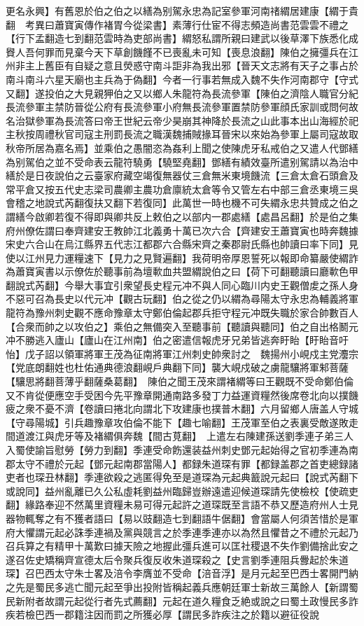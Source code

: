 更名永興】有舊恩於伯之伯之以繕為别駕永忠為記室參軍河南禇緭居建康【緭于貴翻　考異曰蕭寶寅傳作褚胃今從梁書】素薄行仕宦不得志頻造尚書范雲雲不禮之【行下孟翻造七到翻范雲時為吏部尚書】緭怒私謂所親曰建武以後草澤下族悉化成䝿人吾何罪而見棄今天下草創饑饉不已喪亂未可知【喪息浪翻】陳伯之擁彊兵在江州非主上舊臣有自疑之意且熒惑守南斗詎非為我出邪【晉天文志將有天子之事占於南斗南斗六星天廟也主兵為于偽翻】今者一行事若無成入魏不失作河南郡守【守式又翻】遂投伯之大見親狎伯之又以鄉人朱龍符為長流參軍【陳伯之濟陰人職官分紀長流參軍主禁防晉從公府有長流參軍小府無長流參軍置禁防參軍顔氏家訓或問何故名治獄參軍為長流答曰帝王世紀云帝少昊崩其神降於長流之山此事本出山海經於祀主秋按周禮秋官司寇主刑罰長流之職漢魏捕賊掾耳晉宋以來始為參軍上屬司寇故取秋帝所居為嘉名焉】並乘伯之愚闇恣為姦利上聞之使陳虎牙私戒伯之又遣人代鄧繕為别駕伯之並不受命表云龍符驍勇【驍堅堯翻】鄧繕有績效臺所遣别駕請以為治中繕於是日夜說伯之云臺家府藏空竭復無器仗三倉無米東境饑流【三倉太倉石頭倉及常平倉又按五代史志梁司農卿主農功倉廪統太倉等令又管左右中部三倉丞東境三吳會稽之地說式芮翻復扶又翻下若復同】此萬世一時也機不可失緭永忠共贊成之伯之謂繕今啟卿若復不得即與卿共反上敕伯之以部内一郡處繕【處昌呂翻】於是伯之集府州僚佐謂曰奉齊建安王教帥江北義勇十萬已次六合【齊建安王蕭寶寅也時奔魏據宋史六合山在烏江縣界五代志江都郡六合縣宋齊之秦郡尉氏縣也帥讀曰率下同】見使以江州見力運糧速下【見力之見賢遍翻】我荷明帝厚恩誓死以報即命纂嚴使緭詐為蕭寶寅書以示僚佐於聽事前為壇㰱血共盟緭說伯之曰【荷下可翻聽讀曰廳㰱色甲翻說式芮翻】今舉大事宜引衆望長史程元冲不與人同心臨川内史王觀僧䖍之孫人身不惡可召為長史以代元冲【觀古玩翻】伯之從之仍以緭為尋陽太守永忠為輔義將軍龍符為豫州刺史觀不應命豫章太守鄭伯倫起郡兵拒守程元冲既失職於家合帥數百人【合衆而帥之以攻伯之】乘伯之無備突入至聽事前【聽讀與聽同】伯之自出格鬭元冲不勝逃入廬山【廬山在江州南】伯之密遣信報虎牙兄弟皆逃奔盱眙【盱眙音吁怡】戊子詔以領軍將軍王茂為征南將軍江州刺史帥衆討之　魏揚州小峴戍主党灋宗【党底朗翻姓也杜佑通典德浪翻峴戶典翻下同】襲大峴戍破之虜龍驤將軍邾菩薩【驤思將翻菩薄乎翻薩桑葛翻】　陳伯之聞王茂來謂褚緭等曰王觀既不受命鄭伯倫又不肯從便應空手受困今先平豫章開通南路多發丁力益運資糧然後席卷北向以撲饑疲之衆不憂不濟【卷讀曰捲北向謂北下攻建康也撲普木翻】六月留鄉人唐盖人守城【守尋陽城】引兵趣豫章攻伯倫不能下【趣七喻翻】王茂軍至伯之表裏受敵遂敗走間道渡江與虎牙等及褚緭俱奔魏【間古莧翻】　上遣左右陳建孫送劉季連子弟三人入蜀使諭旨慰勞【勞力到翻】季連受命飭還装益州刺史鄧元起始得之官初季連為南郡太守不禮於元起【鄧元起南郡當陽人】都録朱道琛有罪【都録盖郡之首吏總録諸吏者也琛丑林翻】季連欲殺之逃匿得免至是道琛為元起典籖說元起曰【說式芮翻下或說同】益州亂離已久公私虛耗劉益州臨歸豈辦遠遣迎候道琛請先使檢校【使疏吏翻】緣路奉迎不然萬里資糧未易可得元起許之道琛既至言語不恭又歷造府州人士見器物輒奪之有不獲者語曰【易以豉翻造七到翻語牛倨翻】會當屬人何須苦惜於是軍府大懼謂元起必誅季連禍及黨與競言之於季連季連亦以為然且懼昔之不禮於元起乃召兵算之有精甲十萬歎曰據天險之地握此彊兵進可以匡社稷退不失作劉備捨此安之遂召佐史矯稱齊宣德太后令聚兵復反收朱道琛殺之【史言劉季連阻兵釁起於朱道琛】召巴西太守朱士畧及涪令李膺並不受命【涪音浮】是月元起至巴西士畧開門納之先是蜀民多逃亡聞元起至爭出投附皆稱起義兵應朝廷軍士新故三萬餘人【新謂蜀民新附者故謂元起從行者先式薦翻】元起在道久糧食乏絶或說之曰蜀土政慢民多詐疾若檢巴西一郡籍注因而罰之所獲必厚【謂民多詐疾注之於籍以避征役說